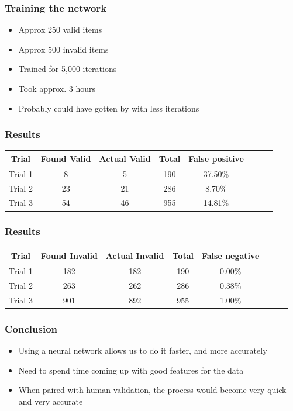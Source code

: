 \documentclass{beamer}
\begin{document}
\begin{frame}
    \frametitle{Training the network}
    \begin{itemize}
        \item Approx 250 valid items
        \item Approx 500 invalid items
        \item Trained for 5,000 iterations
        \item Took approx. 3 hours
        \item Probably could have gotten by with less iterations
    \end{itemize}
\end{frame}

\begin{frame}
    \frametitle{Results}
    {\small
    \begin{tabular}{|c|c|c|c|c|c|c|c|}
        \hline
        \textbf{Trial} &  \textbf{Found Valid} & \textbf{Actual Valid} &
        \textbf{Total} & \textbf{False positive} \\\hline
        Trial 1 &   8 &   5 &   190 & 37.50\% \\\hline
        Trial 2 & 23 &  21 &  286 & 8.70\% \\\hline
        Trial 3 & 54 &  46 &  955 & 14.81\% \\\hline
    \end{tabular}
    }
\end{frame}

\begin{frame}
    \frametitle{Results}
    {\small
    \begin{tabular}{|c|c|c|c|c|c|c|c|}
        \hline
        \textbf{Trial} &  \textbf{Found Invalid} & \textbf{Actual Invalid} &
        \textbf{Total} & \textbf{False negative} \\\hline
        Trial 1 & 182 & 182 & 190 & 0.00\% \\\hline
        Trial 2 & 263 & 262 & 286 & 0.38\% \\\hline
        Trial 3 & 901 & 892 & 955 & 1.00\% \\\hline
    \end{tabular}

    }
\end{frame}

\begin{frame}
    \frametitle{Conclusion}
    \begin{itemize}
        \item Using a neural network allows us to do it faster, and more
        accurately
        \item Need to spend time coming up with good features for the data
        \item When paired with human validation, the process would become very
        quick and very accurate

    \end{itemize}
\end{frame}
\end{document}
